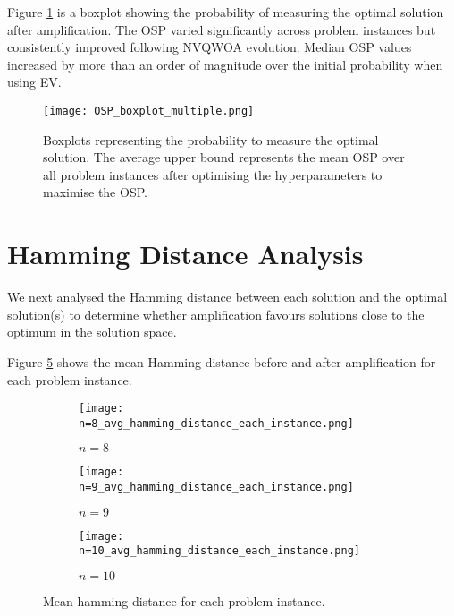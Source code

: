 Figure \ref{fig:osp} is a boxplot showing the probability of measuring the optimal solution after amplification. The OSP varied significantly across problem instances but consistently improved following NVQWOA evolution. Median OSP values increased by more than an order of magnitude over the initial probability when using EV.

\begin{figure}[htbp]
    \centering
    \texttt{[image: OSP\_boxplot\_multiple.png]} 
    \caption{Boxplots representing the probability to measure the optimal solution. The average upper bound represents the mean OSP over all problem instances after optimising the hyperparameters to maximise the OSP.}
    \label{fig:osp}
\end{figure}



\section{Hamming Distance Analysis}
We next analysed the Hamming distance between each solution and the optimal solution(s) to determine whether amplification favours solutions close to the optimum in the solution space.

Figure \ref{fig:avg ham} shows the mean Hamming distance before and after amplification for each problem instance.
\begin{figure}[htbp]
     \centering
     \begin{subfigure}{0.45\textwidth}
         \centering
         \texttt{[image: n=8\_avg\_hamming\_distance\_each\_instance.png]}
         \caption{$n=8$}
         \label{fig:avg ham 8}
     \end{subfigure}
     \hfill
     \begin{subfigure}{0.45\textwidth}
         \centering
         \texttt{[image: n=9\_avg\_hamming\_distance\_each\_instance.png]}
         \caption{$n=9$}
         \label{fig:avg ham 9}
     \end{subfigure}
     \hfill
     \begin{subfigure}{\textwidth}
         \centering
         \texttt{[image: n=10\_avg\_hamming\_distance\_each\_instance.png]}
         \caption{$n=10$}
         \label{fig:avg ham 10}
     \end{subfigure}
        \caption{Mean hamming distance for each problem instance.}
        \label{fig:avg ham}
\end{figure}

